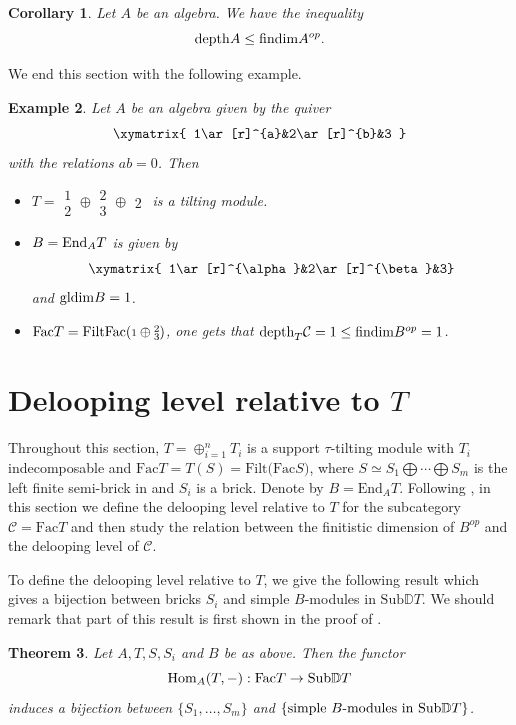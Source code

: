 \documentclass[a4paper]{amsart}
\newtheorem{thm}{Theorem}[section]
\newtheorem{cor}[thm]{Corollary}
\newtheorem{exm}[thm]{Example}
\theoremstyle{definition}
\theoremstyle{remark}
\numberwithin{equation}{section}
\begin{document}
\begin{cor}\label{3.4}
Let $A$ be an algebra. We have the inequality
$${\rm depth}A \leq {\rm findim}A^{op}.$$
\end{cor}

We end this section with the following example.

\begin{exm}\label{3.5} Let $A$ be an algebra given by the quiver \[\xymatrix{
1\ar[r]^{a}&2\ar[r]^{b}&3
}\]  with the relations $ab=0$. Then
\begin{itemize}
    \item
    [(1)] $T=\substack{1\\2}\oplus\substack{2\\3}\oplus \substack{2}$ is a tilting module.
    \item
    [(2)] $B=\textup{End}_A T$ is given by \[\xymatrix{
1\ar[r]^{\alpha}&2\ar[r]^{\beta}&3} \]and $\textup{gldim}B=1$.
    \item
    [(3)] $\textup{Fac}T=\textup{FiltFac}(\substack{1}\oplus \substack{2\\3})$, one gets that
    $\textup{depth}_T \mathcal{C}=1\leq \textup{findim}B^{op}=1$.
\end{itemize}
\end{exm}


\section{Delooping level relative to $T$}

 Throughout this section, $T=\oplus_{i=1}^nT_i$ is a support $\tau$-tilting module with $T_i$ indecomposable and $\text{Fac}T=T(S)=\text{Filt(Fac}S)$, where $S\simeq S_1\bigoplus \cdots \bigoplus S_m$ is the left finite semi-brick in \cite[ Theorem 2.3(2)]{As}
 and $S_i$ is a brick. Denote by $B=\text{End}_A T$. Following \cite{CLZZ}, in this section we define the delooping level relative to $T$ for the subcategory $\mathcal{C}=\text{Fac}T$ and then study the relation between the finitistic dimension of $B^{op}$ and the delooping level of $\mathcal{C}$.


To define the delooping level relative to $T$, we give the following result which gives a bijection between bricks $S_i$ and simple $B$-modules in $\text{Sub}\mathbb{D}T$. We should remark that part of this result is first shown in the proof of \cite[Theorem 2.27]{As}.

\begin{thm}\label{4.2}
 Let $A, T, S, S_i$ and $ B$ be as above. Then the functor
 $$\textup{Hom}_A(T, -): \textup{Fac}T \to \textup{Sub}\mathbb{D}T$$
  induces a bijection between $\{S_1, \dots, S_m\}$ and $\{\text{simple $B$-modules in \textup{Sub}}\mathbb{D}T\}$.
\end{thm}
\end{document}
